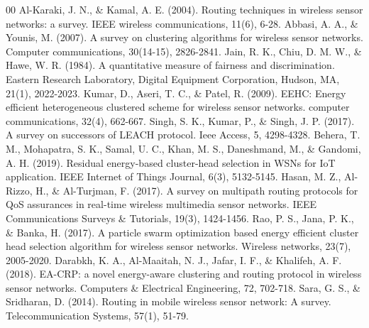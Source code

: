 \documentclass[conference]{IEEEtran}
\begin{document}
\begin{thebibliography}{00}
 Al-Karaki, J. N., \& Kamal, A. E. (2004). Routing techniques in wireless sensor networks: a survey. IEEE wireless communications, 11(6), 6-28.
 Abbasi, A. A., \& Younis, M. (2007). A survey on clustering algorithms for wireless sensor networks. Computer communications, 30(14-15), 2826-2841.
 Jain, R. K., Chiu, D. M. W., \& Hawe, W. R. (1984). A quantitative measure of fairness and discrimination. Eastern Research Laboratory, Digital Equipment Corporation, Hudson, MA, 21(1), 2022-2023.
 Kumar, D., Aseri, T. C., \& Patel, R. (2009). EEHC: Energy efficient heterogeneous clustered scheme for wireless sensor networks. computer communications, 32(4), 662-667.
 Singh, S. K., Kumar, P., \& Singh, J. P. (2017). A survey on successors of LEACH protocol. Ieee Access, 5, 4298-4328.
 Behera, T. M., Mohapatra, S. K., Samal, U. C., Khan, M. S., Daneshmand, M., \& Gandomi, A. H. (2019). Residual energy-based cluster-head selection in WSNs for IoT application. IEEE Internet of Things Journal, 6(3), 5132-5145.
 Hasan, M. Z., Al-Rizzo, H., \& Al-Turjman, F. (2017). A survey on multipath routing protocols for QoS assurances in real-time wireless multimedia sensor networks. IEEE Communications Surveys \& Tutorials, 19(3), 1424-1456.
 Rao, P. S., Jana, P. K., \& Banka, H. (2017). A particle swarm optimization based energy efficient cluster head selection algorithm for wireless sensor networks. Wireless networks, 23(7), 2005-2020.
 Darabkh, K. A., Al-Maaitah, N. J., Jafar, I. F., \& Khalifeh, A. F. (2018). EA-CRP: a novel energy-aware clustering and routing protocol in wireless sensor networks. Computers \& Electrical Engineering, 72, 702-718.
 Sara, G. S., \& Sridharan, D. (2014). Routing in mobile wireless sensor network: A survey. Telecommunication Systems, 57(1), 51-79.
\end{thebibliography}

\vspace{12pt}
\end{document}
